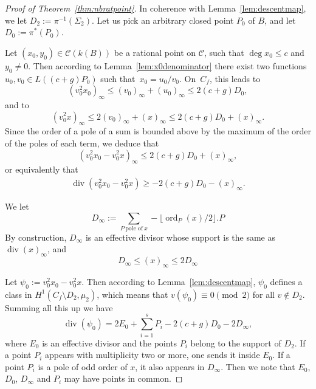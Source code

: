 \documentclass[11pt]{article}
\theoremstyle{plain}
\theoremstyle{definition}
\DeclareMathOperator{\ord}{ord}
\DeclareMathOperator{\divisor}{div}
\begin{document}
\begin{proof}[Proof of Theorem~\ref{thm:nbratpoint}]
In coherence with Lemma~\ref{lem:descentmap}, we let $D_2:=\pi^{-1}(\Sigma_2)$. Let us pick an arbitrary closed point $P_0$ of $B$, 
and let $D_0:=\pi^*(P_0)$.

Let $(x_0,y_0)\in \mathcal{C}(k(B))$ be a rational point on $\mathcal{C}$, such that $\deg x_0\leq c$ and $y_0\neq 0$.
Then according to Lemma~\ref{lem:x0denominator} there exist two functions $u_0,v_0 \in L((c+g)P_0)$ such that~$x_0=u_0/v_0$. On~$C_f$,
this leads to
$$
(v_0^2 x_0)_\infty \leq (v_0)_\infty + (u_0)_\infty \leq 2(c+g)D_0,
$$
and to
$$
(v_0^2 x)_\infty \leq 2(v_0)_\infty + (x)_\infty \leq 2(c+g)D_0 + (x)_\infty.
$$
Since the order of a pole of a sum is bounded above by the maximum of the order of the poles of each term,
we deduce that
$$
(v_0^2x_0-v_0^2 x)_\infty \leq 2(c+g)D_0 + (x)_\infty,
$$
or equivalently that
\begin{align}
\label{eq:v0squared}
\divisor(v_0^2x_0-v_0^2x) \geq -2(c+g)D_0 - (x)_\infty.
\end{align}

We let
$$
D_\infty:= \sum_{P~\text{pole of}~x} -\lfloor\ord_P(x)/2\rfloor.P
$$
By construction, $D_\infty$ is an effective divisor whose support is the same as $\divisor(x)_\infty$, and
\begin{equation}
\label{eq:D_x_infty}
D_\infty \leq (x)_\infty\leq 2D_\infty
\end{equation}

Let $\psi_0 :=v_0^2x_0-v_0^2x$. Then according to Lemma~\ref{lem:descentmap}, $\psi_0$ defines a class in $H^1(C_f\setminus D_2,\mu_2)$, which means that $v(\psi_0) \equiv 0 \pmod{2}$ for all $v\not\in D_2$. Summing all this up we have
\begin{equation}
\label{eq:divpsi0}
\divisor(\psi_0)=2E_0+\sum_{i=1}^s P_i -2(c+g)D_0 - 2D_\infty,
\end{equation}
where $E_0$ is an effective divisor and the points $P_i$ belong to the support of $D_2$. If a point $P_i$ appears with multiplicity two or more, one sends it inside $E_0$. If a point $P_i$ is a pole of odd order of $x$, it also appears in $D_\infty$. Then we note that $E_0$, $D_0$, $D_\infty$ and $P_i$ may have points in common.



\end{proof}
\end{document}
